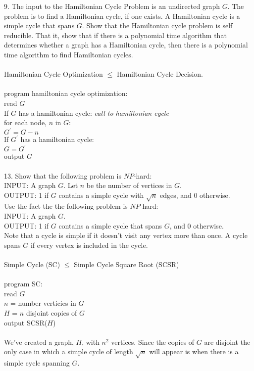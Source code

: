 \documentclass[10pt]{article}
\newcommand{\tab}{\hspace*{2em}}
\newcommand{\tabb}{\hspace*{4em}}
\newcommand{\tabbb}{\hspace*{6em}}
\newcommand{\tabbbb}{\hspace*{8em}}
\begin{document}
		9. The input to the Hamiltonian Cycle Problem is an undirected graph $G$. The problem is to find a
		Hamiltonian cycle, if one exists. A Hamiltonian cycle is a simple cycle that spans $G$. Show that the
		Hamiltonian cycle problem is self reducible. That it, show that if there is a polynomial time algorithm
		that determines whether a graph has a Hamiltonian cycle, then there is a polynomial time algorithm
		to find Hamiltonian cycles.
		\\
		\\
		Hamiltonian Cycle Optimization $\leq$ Hamiltonian Cycle Decision.\\
		\\
		program hamiltonian cycle optimization:\\
		\tab read $G$\\
		\tab If $G$ has a hamiltonian cycle: \emph{call to hamiltonian cycle}\\ 
		\tabb for each node, $n$ in $G$:\\
		\tabbb $G^\prime = G - n$\\
		\tabbb If $G^\prime$ has a hamiltonian cycle:\\
		\tabbbb $G = G^\prime$\\
		\tab output $G$
		\\
		\\
		13. Show that the following problem is $NP$-hard:\\
		INPUT: A graph $G$. Let $n$ be the number of vertices in $G$.\\
		OUTPUT: 1 if $G$ contains a simple cycle with $\sqrt{n}$ edges, and 0 otherwise.\\
		Use the fact the the following problem is $NP$-hard:\\
		INPUT: A graph $G$.\\
		OUTPUT: 1 if $G$ contains a simple cycle that spans $G$, and 0 otherwise.\\
		Note that a cycle is simple if it doesn’t visit any vertex more than once. A cycle spans $G$ if every
		vertex is included in the cycle.\\
		\\
		Simple Cycle (SC) $\leq$ Simple Cycle Square Root (SCSR)\\
		\\
		program SC:\\
		\tab read $G$\\
		\tab $n$ = number verticies in $G$\\
		\tab $H$ = $n$ disjoint copies of $G$\\
		\tab output SCSR($H$)\\
		\\
		We've created a graph, $H$, with $n^2$ vertices. Since the copies of $G$ are disjoint the only case in which a simple cycle of 
		length $\sqrt{n}$ will appear is when there is a simple cycle spanning $G$.
\end{document}
